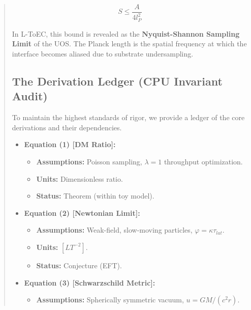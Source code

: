 \documentclass[11pt,titlepage]{article}
\begin{document}
\begin{abstract}
\begin{equation}
S \le \frac{A}{4l_P^2}
\end{equation}

In L-ToEC, this bound is revealed as the \textbf{Nyquist-Shannon Sampling Limit} of the UOS. The Planck length is the spatial frequency at which the interface becomes aliased due to substrate undersampling.

\subsection{The Derivation Ledger (CPU Invariant Audit)}
To maintain the highest standards of rigor, we provide a ledger of the core derivations and their dependencies.

\begin{itemize}
    
\item \textbf{Equation (1) [DM Ratio]:} 
        \begin{itemize}
            
\item \textbf{Assumptions:} Poisson sampling, $\lambda=1$ throughput optimization.
            
\item \textbf{Units:} Dimensionless ratio.
            
\item \textbf{Status:} Theorem (within toy model).
        \end{itemize}
    
\item \textbf{Equation (2) [Newtonian Limit]:}
        \begin{itemize}
            
\item \textbf{Assumptions:} Weak-field, slow-moving particles, $\varphi = \kappa  \tau_{lat}$.
            
\item \textbf{Units:} $[L T^{-2}]$.
            
\item \textbf{Status:} Conjecture (EFT).
        \end{itemize}
    
\item \textbf{Equation (3) [Schwarzschild Metric]:}
        \begin{itemize}
            
\item \textbf{Assumptions:} Spherically symmetric vacuum, $u = GM/(c^2 r)$.
            

\end{itemize}
\end{itemize}
\end{abstract}
\end{document}
